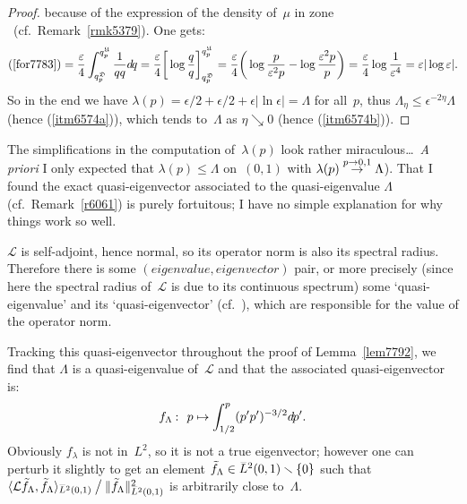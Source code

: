 \begin{proof}
because of the expression of the density of~$\mu$ in zone \twocirc\ (cf.\ Remark~\ref{rmk5379}).
One gets:
%
\[(\ref{for7783}) = \frac{\epsilon}{4} \int_{q^{\mfrak{D}}_p}^{q^{\mfrak{U}}_p} \frac{1}{q\bar{q}} \dx{q}
= \frac{\epsilon}{4} \bigg[ \ln \frac{q}{\bar{q}} \bigg]_{q^{\mfrak{D}}_p}^{q^{\mfrak{U}}_p}
= \frac{\epsilon}{4} \bigg(\ln \frac{\bar{p}}{\epsilon^2p} - \ln \frac{\epsilon^2\bar{p}}{p} \bigg)
= \frac{\epsilon}{4} \ln\frac{1}{\epsilon^4} = \epsilon|\ln\epsilon|.\]
%
So in the end we have $\lambda(p) = \epsilon/2+\epsilon/2+\epsilon|\ln\epsilon| = \Lambda$
for all~$p$, thus $\Lambda_{\eta} \leq \epsilon^{-2\eta}\Lambda$ (hence (\ref{itm6574a})),
which tends to~$\Lambda$ as $\eta\searrow0$ (hence (\ref{itm6574b})).
\end{proof}\endgroup

\begin{Rmk}
The simplifications in the computation of~$\lambda(p)$ look rather miraculous\dots\
\emph{A priori} I only expected that $\lambda(p) \leq \Lambda$ on~$(0,1)$
with $\lambda(p) \stackrel{p\to 0,1}{\to} \Lambda$).
That I found the exact quasi-eigenvector
associated to the quasi-eigenvalue $\Lambda$ (cf.\ Remark~\ref{r6061})
is purely fortuitous; I have no simple explanation for why things work so well.
\end{Rmk}

\begin{Rmk}\label{r6061}
$\mathcal{L}$ is self-adjoint, hence normal,
so its operator norm is also its spectral radius.
Therefore there is some $(\textit{eigenvalue},\textit{eigenvector})$ pair,
or more precisely (since here the spectral radius of~$\mathcal{L}$ is due to its continuous spectrum)
some `quasi-eigenvalue' and its `quasi-eigenvector'
(cf.~\cite[\S~4]{nonstandard}), which are responsible for the value of the operator norm.

Tracking this quasi-eigenvector throughout the proof of Lemma~\ref{lem7792},
we find that $\Lambda$ is a quasi-eigenvalue of~$\mathcal{L}$
and that the associated quasi-eigenvector is:
\[ f_{\Lambda} \colon p \mapsto \int_{1/2}^p (p'\bar{p}')^{-3/2} \dx{p'} .\]
%
Obviously $f_{\lambda}$ is not in~$L^2$,
so it is not a true eigenvector; however
one can perturb it slightly to get an element $\tilde{f}_\Lambda\in\ldb(0,1)\setminus\{0\}$
such that $\langle \mathcal{L}\tilde{f}_{\Lambda},\tilde{f}_{\Lambda} \rangle_{\ldb(0,1)}
\mathbin{\big/}
\|\tilde{f}_{\Lambda}\|_{\ldb(0,1)}^2$
is arbitrarily close to~$\Lambda$.
\end{Rmk}

